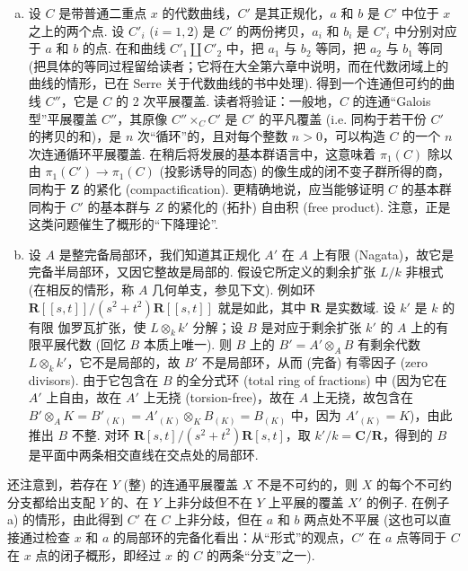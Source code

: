 \begin{enumerate}[a)]
\item 设 $C$ 是带普通二重点 $x$ 的代数曲线，$C'$ 是其正规化，$a$ 和 $b$ 是 $C'$ 中位于 $x$ 之上的两个点. 设 $C'_i$ ($i = 1, 2$) 是 $C'$ 的两份拷贝，$a_i$ 和 $b_i$ 是 $C'_i$ 中分别对应于 $a$ 和 $b$ 的点. 在和曲线 $C'_1 \amalg C'_2$ 中，把 $a_1$ 与 $b_2$ 等同，把 $a_2$ 与 $b_1$ 等同 (把具体的等同过程留给读者；它将在大全第六章中说明，而在代数闭域上的曲线的情形，已在 Serre 关于代数曲线的书中处理). 得到一个连通但可约的曲线 $C''$，它是 $C$ 的 2 次平展覆盖. 读者将验证：一般地，$C$ 的连通``Galois 型''平展覆盖 $C''$，其原像 $C'' \times_C C'$ 是 $C'$ 的平凡覆盖 (i.e. 同构于若干份 $C'$ 的拷贝的和)，是 $n$ 次``循环''的，且对每个整数 $n > 0$，可以构造 $C$ 的一个 $n$ 次连通循环平展覆盖. 在稍后将发展的基本群语言中，这意味着 $\pi_1(C)$ 除以由 $\pi_1(C') \to \pi_1(C)$ (投影诱导的同态) 的像生成的闭不变子群所得的商，同构于 $\mathbf{Z}$ 的紧化 (compactification). 更精确地说，应当能够证明 $C$ 的基本群同构于 $C'$ 的基本群与 $Z$ 的紧化的 (拓扑) 自由积 (free product). 注意，正是这类问题催生了概形的``下降理论''.
\item 设 $A$ 是整完备局部环，我们知道其正规化 $A'$ 在 $A$ 上有限 (Nagata)，故它是完备半局部环，又因它整故是局部的. 假设它所定义的剩余扩张 $L/k$ 非根式 (在相反的情形，称 $A$ 几何单支，参见下文). 例如环 $\mathbf{R}[\![s, t]\!]/(s^2 + t^2)\mathbf{R}[\![s, t]\!]$ 就是如此，其中 $\mathbf{R}$ 是实数域. 设 $k'$ 是 $k$ 的有限 伽罗瓦扩张，使 $L \otimes_k k'$ 分解；设 $B$ 是对应于剩余扩张 $k'$ 的 $A$ 上的有限平展代数 (回忆 $B$ 本质上唯一). 则 $B$ 上的 $B' = A' \otimes_A B$ 有剩余代数 $L \otimes_k k'$，它不是局部的，故 $B'$ 不是局部环，从而 (完备) 有零因子 (zero divisors). 由于它包含在 $B$ 的全分式环 (total ring of fractions) 中 (因为它在 $A'$ 上自由，故在 $A'$ 上无挠 (torsion-free)，故在 $A$ 上无挠，故包含在 $B' \otimes_A K = B'_{(K)} = A'_{(K)} \otimes_K B_{(K)} = B_{(K)}$ 中，因为 $A'_{(K)} = K$)，由此推出 $B$ 不整. 对环 $\mathbf{R}[s, t]/(s^2 + t^2)\mathbf{R}[s, t]$，取 $k'/k = \mathbf{C}/\mathbf{R}$，得到的 $B$ 是平面中两条相交直线在交点处的局部环.
\end{enumerate}

还注意到，若存在 $Y$ (整) 的连通平展覆盖 $X$ 不是不可约的，则 $X$ 的每个不可约分支都给出支配 $Y$ 的、在 $Y$ 上非分歧但不在 $Y$ 上平展的覆盖 $X'$ 的例子. 在例子 a) 的情形，由此得到 $C'$ 在 $C$ 上非分歧，但在 $a$ 和 $b$ 两点处不平展 (这也可以直接通过检查 $x$ 和 $a$ 的局部环的完备化看出：从``形式''的观点，$C'$ 在 $a$ 点等同于 $C$ 在 $x$ 点的闭子概形，即经过 $x$ 的 $C$ 的两条``分支''之一).

